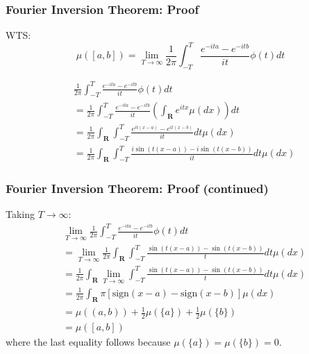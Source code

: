 \documentclass[handout]{beamer}
\begin{document}
\frame
{
  \frametitle{Fourier Inversion Theorem: Proof} 

WTS: $$\mu([a,b])=\lim_{T\rightarrow \infty} \frac{1}{2\pi} \int_{-T}^T \frac{e^{-ita}-e^{-itb}}{it} \phi(t) dt$$

\begin{align*}
&\frac{1}{2\pi} \int_{-T}^T \frac{e^{-ita}-e^{-itb}}{it} \phi(t) dt \\
&= \frac{1}{2\pi} \int_{-T}^T \frac{e^{-ita}-e^{-itb}}{it} \left( \int_{\mathbf{R}} e^{itx} \mu(dx)  \right) dt  \\
&= \frac{1}{2\pi} \int_{\mathbf{R}} \int_{-T}^T \frac{ e^{it(x-a)}-  e^{it(x-b)}  }{it} dt  \mu(dx) \tag{Fubini and first Lemma}\\ 
&= \frac{1}{2\pi} \int_{\mathbf{R}} \int_{-T}^T \frac{ i\sin(t(x-a))- i \sin( t(x-b))  }{it} dt  \mu(dx)  
\end{align*}  
}

\frame
{
  \frametitle{Fourier Inversion Theorem: Proof (continued) } 
Taking $T \to \infty$:
\begin{align*}
& \lim_{T \to \infty} \frac{1}{2\pi} \int_{-T}^T \frac{e^{-ita}-e^{-itb}}{it} \phi(t) dt \\
&= \lim_{T \to \infty}\frac{1}{2\pi} \int_{\mathbf{R}} \int_{-T}^T \frac{ \sin(t(x-a))-  \sin( t(x-b))  }{t} dt  \mu(dx)  \\
&= \frac{1}{2\pi}   \int_{\mathbf{R}} \lim_{T \to \infty} \int_{-T}^T \frac{ \sin(t(x-a))-  \sin( t(x-b))  }{t} dt  \mu(dx)  \tag{DCT} \\
&= \frac{1}{2\pi}   \int_{\mathbf{R}} \pi\left[\text{sign}(x-a) - \text{sign}(x-b) \right]  \mu(dx)  \tag{Lemma 2} \\
&= \mu((a,b)) + \frac{1}{2} \mu(\{a\}) + \frac{1}{2}\mu(\{b\}) \\
&=\mu([a,b])
\end{align*}  
where the last equality follows because $\mu(\{a\})=\mu(\{b\})=0$.	

}
\end{document}
